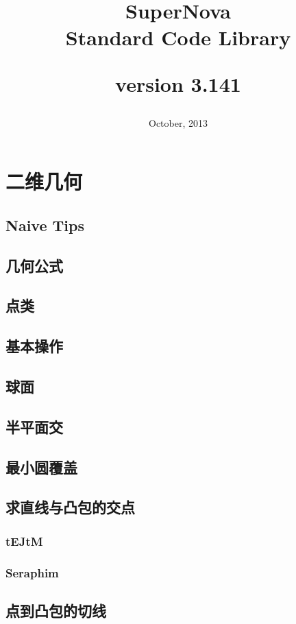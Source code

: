 \documentclass[a4paper,10pt]{book}
\title{\Large{SuperNova} \\ [2ex] \LARGE{Standard Code Library} \\[2ex] \begin{normalsize} version 3.141 \end{normalsize}}
\date{October, 2013}
\begin{document}
\maketitle

\tableofcontents

\newpage

\chapter{二维几何}
	\section{Naive Tips}
		
	\section{几何公式}
		
	\section{点类}
		
	\section{基本操作}
		
	\section{球面}
		
	\section{半平面交}
		
	\section{最小圆覆盖}
		
	\section{求直线与凸包的交点}
		\subsection{tEJtM}
			
		\subsection{Seraphim}
			
	\section{点到凸包的切线}
	    
\end{document}
